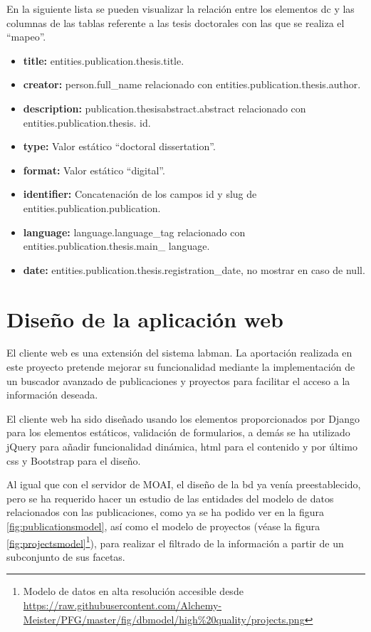 En la siguiente lista se pueden visualizar la relación entre los elementos \acrshort{dc} y las columnas de las tablas referente a las tesis doctorales con las que se realiza el ``mapeo''.

\begin{itemize}
	\item \textbf{title:} entities.publication.thesis.title.
	\item \textbf{creator:} person.full\_name relacionado con entities.publication.thesis.author.
	\item \textbf{description:} publication.thesisabstract.abstract relacionado con entities.publication.thesis. id.
	\item \textbf{type:} Valor estático ``doctoral dissertation''.
	\item \textbf{format:} Valor estático ``digital''.
	\item \textbf{identifier:} Concatenación de los campos id y slug de entities.publication.publication.
	\item \textbf{language:} language.language\_tag relacionado con entities.publication.thesis.main\_ language.
	\item \textbf{date:} entities.publication.thesis.registration\_date, no mostrar en caso de null.
\end{itemize}

\section{Diseño de la aplicación web}

El cliente web es una extensión del sistema \acrshort{labman}. La aportación realizada en este proyecto pretende mejorar su funcionalidad mediante la implementación de un buscador avanzado de publicaciones y proyectos para facilitar el acceso a la información deseada.

El cliente web ha sido diseñado usando los elementos proporcionados por Django para los elementos estáticos, validación de formularios, a demás se ha utilizado jQuery para añadir funcionalidad dinámica, \acrshort{html} para el contenido y por último \acrshort{css} y Bootstrap para el diseño.

Al igual que con el servidor de MOAI, el diseño de la \acrshort{bd} ya venía preestablecido, pero se ha requerido hacer un estudio de las entidades del modelo de datos relacionados con las publicaciones, como ya se ha podido ver en la figura \ref{fig:publicationsmodel}, así como el modelo de proyectos (véase la figura \ref{fig:projectsmodel}\footnote{Modelo de datos en alta resolución accesible desde \url{https://raw.githubusercontent.com/Alchemy-Meister/PFG/master/fig/dbmodel/high\%20quality/projects.png}}), para realizar el filtrado de la información a partir de un subconjunto de sus facetas.

